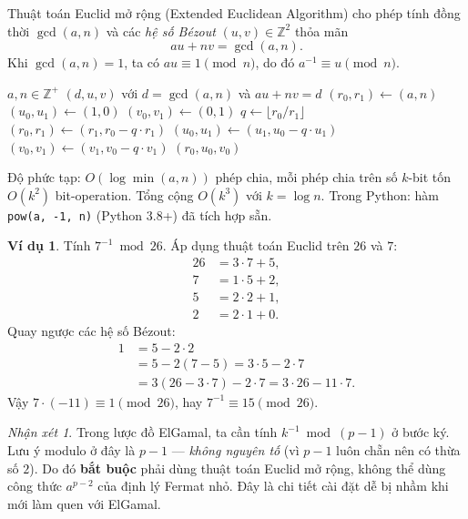 \documentclass[12pt,a4paper]{report}
\theoremstyle{definition}
\newtheorem{example}[theorem]{Ví dụ}
\theoremstyle{remark}
\newtheorem{remark}[theorem]{Nhận xét}
\begin{document}
Thuật toán Euclid mở rộng (Extended Euclidean Algorithm) cho phép tính đồng thời $\gcd(a, n)$ và các \emph{hệ số Bézout} $(u, v) \in \mathbb{Z}^2$ thỏa mãn
\[
au + nv = \gcd(a, n).
\]
Khi $\gcd(a, n) = 1$, ta có $au \equiv 1 \pmod{n}$, do đó $a^{-1} \equiv u \pmod{n}$.

\begin{algorithm}[H]
\caption{Thuật toán Euclid mở rộng}
\label{alg:extgcd}
\begin{algorithmic}[1]
\Require $a, n \in \mathbb{Z}^+$
\Ensure $(d, u, v)$ với $d = \gcd(a, n)$ và $au + nv = d$
\State $(r_0, r_1) \gets (a, n)$
\State $(u_0, u_1) \gets (1, 0)$
\State $(v_0, v_1) \gets (0, 1)$
    \State $q \gets \lfloor r_0 / r_1 \rfloor$
    \State $(r_0, r_1) \gets (r_1, r_0 - q \cdot r_1)$
    \State $(u_0, u_1) \gets (u_1, u_0 - q \cdot u_1)$
    \State $(v_0, v_1) \gets (v_1, v_0 - q \cdot v_1)$
\EndWhile
\State \Return $(r_0, u_0, v_0)$
\end{algorithmic}
\end{algorithm}

Độ phức tạp: $O(\log \min(a, n))$ phép chia, mỗi phép chia trên số $k$-bit tốn $O(k^2)$ bit-operation. Tổng cộng $O(k^3)$ với $k = \log n$. Trong Python: hàm \texttt{pow(a, -1, n)} (Python 3.8+) đã tích hợp sẵn.

\begin{example}
Tính $7^{-1} \bmod 26$. Áp dụng thuật toán Euclid trên $26$ và $7$:
\begin{align*}
26 &= 3 \cdot 7 + 5, \\
7  &= 1 \cdot 5 + 2, \\
5  &= 2 \cdot 2 + 1, \\
2  &= 2 \cdot 1 + 0.
\end{align*}
Quay ngược các hệ số Bézout:
\begin{align*}
1 &= 5 - 2\cdot 2 \\
  &= 5 - 2(7 - 5) = 3\cdot 5 - 2\cdot 7 \\
  &= 3(26 - 3\cdot 7) - 2\cdot 7 = 3\cdot 26 - 11\cdot 7.
\end{align*}
Vậy $7 \cdot (-11) \equiv 1 \pmod{26}$, hay $7^{-1} \equiv 15 \pmod{26}$.
\end{example}

\begin{remark}
\label{rmk:euclid-elgamal}
Trong lược đồ ElGamal, ta cần tính $k^{-1} \bmod (p-1)$ ở bước ký. Lưu ý modulo ở đây là $p-1$ --- \emph{không nguyên tố} (vì $p-1$ luôn chẵn nên có thừa số $2$). Do đó \textbf{bắt buộc} phải dùng thuật toán Euclid mở rộng, không thể dùng công thức $a^{p-2}$ của định lý Fermat nhỏ. Đây là chi tiết cài đặt dễ bị nhầm khi mới làm quen với ElGamal.
\end{remark}
\end{document}

